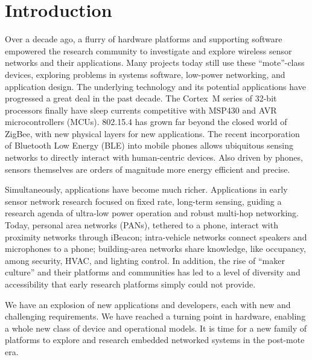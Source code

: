 \section{Introduction}
\label{sec:intro}

Over a decade ago, a flurry of hardware platforms and supporting software
empowered the research community to investigate and explore wireless sensor
networks and their applications. Many projects today still use these
``mote''-class devices, exploring problems in systems software, low-power
networking, and application design.
%
The underlying technology and its potential applications have progressed a
great deal in the past decade. The Cortex~M series of 32-bit processors
finally have sleep currents competitive with MSP430 and AVR microcontrollers (MCUs).
802.15.4 has grown far beyond the closed world of ZigBee, with
new physical layers for new applications. The recent incorporation of
Bluetooth Low Energy (BLE) into mobile phones allows ubiquitous sensing networks to
directly interact with human-centric devices. Also driven by phones, sensors
themselves are orders of magnitude more energy efficient and precise.

Simultaneously, applications have become much richer. Applications in early
sensor network research focused on fixed rate, long-term sensing, guiding a
research agenda of ultra-low power operation and robust multi-hop networking.
Today, personal area networks (PANs), tethered to a phone, interact with
proximity networks through iBeacon; intra-vehicle networks connect speakers
and microphones to a phone; building-area networks share knowledge, like
occupancy, among security, HVAC, and lighting control.
In addition, the rise of ``maker culture'' and their platforms and communities
has led to a level of diversity and accessibility that early research
platforms simply could not provide.

We have an explosion of new applications and developers, each with new and challenging
requirements. We have reached a turning point in hardware, enabling a whole
new class of device and operational models. It is time for a new family of
platforms to explore and research embedded networked systems in the post-mote
era.

